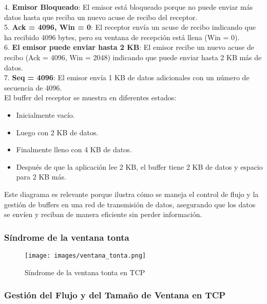 \documentclass[a4paper,12pt]{article}
\begin{document}
4. \textbf{Emisor Bloqueado}: El emisor está bloqueado porque no puede enviar más datos hasta que reciba un nuevo acuse de recibo del receptor.\\

5. \textbf{Ack = 4096, Win = 0}: El receptor envía un acuse de recibo indicando que ha recibido 4096 bytes, pero su ventana de recepción está llena (Win = 0).\\

6. \textbf{El emisor puede enviar hasta 2 KB}: El emisor recibe un nuevo acuse de recibo (Ack = 4096, Win = 2048) indicando que puede enviar hasta 2 KB más de datos.\\

7. \textbf{Seq = 4096}: El emisor envía 1 KB de datos adicionales con un número de secuencia de 4096.\\

El buffer del receptor se muestra en diferentes estados:
\begin{itemize}
    \item Inicialmente vacío.
    \item Luego con 2 KB de datos.
    \item Finalmente lleno con 4 KB de datos.
    \item Después de que la aplicación lee 2 KB, el buffer tiene 2 KB de datos y espacio para 2 KB más.
\end{itemize}


Este diagrama es relevante porque ilustra cómo se maneja el control de flujo y la gestión de buffers en una red de transmisión de datos, asegurando que los datos se envíen y reciban de manera eficiente sin perder información.\\


\subsubsection{Síndrome de la ventana tonta}

\begin{figure}[H]
    \centering
    \texttt{[image: images/ventana\_tonta.png]}
    \caption{Síndrome de la ventana tonta en TCP}
\end{figure}


\subsubsection*{Gestión del Flujo y del Tamaño de Ventana en TCP}
\end{document}
